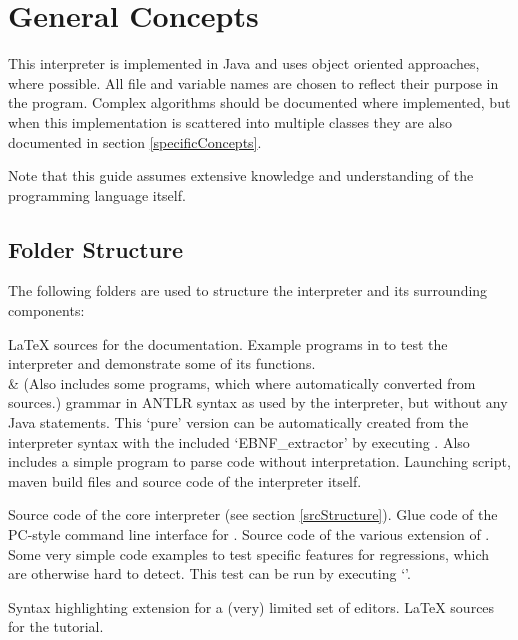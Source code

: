 \section{General Concepts}

This interpreter is implemented in Java and uses object oriented approaches, where possible. All file and variable names are chosen to reflect their purpose in the program. Complex algorithms should be documented where implemented, but when this implementation is scattered into multiple classes they are also documented in section \ref{specificConcepts}.

Note that this guide assumes extensive knowledge and understanding of the \SetlX{} programming language itself.

\subsection{Folder Structure}

The following folders are used to structure the interpreter and its surrounding components:

\begin{itemize}
            {\LaTeX{} sources for the documentation.}
            {Example programs in \SetlX{} to test the interpreter and demonstrate some of its functions.\\&
             (Also includes some programs, which where automatically converted from \SetlTwo{} sources.)}
            {\SetlX{} grammar in ANTLR syntax as used by the interpreter, but without any Java statements. This `pure' version can be automatically created from the interpreter syntax with the included `EBNF\_extractor' by executing . Also includes a simple program to parse \SetlX{} code without interpretation.}
            {Launching script, maven build files and source code of the interpreter itself.}
    \begin{itemize}
                {Source code of the core interpreter (see section \ref{srcStructure}).}
                {Glue code of the PC-style command line interface for \setlX.}
                {Source code of the various extension of \setlX.}
                {Some very simple \SetlX{} code examples to test specific features for regressions, which are otherwise hard to detect. This test can be run by executing `'.}
    \end{itemize}
            {Syntax highlighting extension for a (very) limited set of editors.}
            {\LaTeX{} sources for the tutorial.}
\end{itemize}

